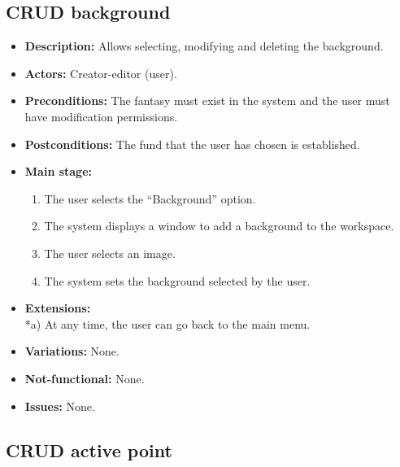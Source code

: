 \subsection{CRUD background}
\begin{itemize}
	\item \textbf{Description:} Allows selecting, modifying and deleting the background.
	\item \textbf{Actors:} Creator-editor (user).
	\item \textbf{Preconditions:} The fantasy must exist in the system and the user must have modification permissions.
	\item \textbf{Postconditions:} The fund that the user has chosen is established.
	\item \textbf{Main stage:}
	\begin{enumerate}
		\item The user selects the ``Background'' option.
		\item The system displays a window to add a background to the workspace.
		\item The user selects an image.
		\item The system sets the background selected by the user.
	\end{enumerate}
	\item \textbf{Extensions:} \\ *a) At any time, the user can go back to the main menu. 
	\item \textbf{Variations:} None.
	\item \textbf{Not-functional:} None.
	\item \textbf{Issues:} None.
\end{itemize}


\subsection{CRUD active point}
